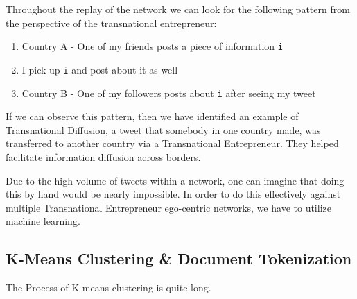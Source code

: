 \par

Throughout the replay of the network we can look for the following pattern from the perspective of the transnational entrepreneur:

\begin{enumerate}
\item Country A - One of my friends posts a piece of information \verb|i| 
\item I pick up \verb|i| and post about it as well
\item Country B - One of my followers posts about \verb|i| after seeing my tweet
\end{enumerate}

If we can observe this pattern, then we have identified an example of Transnational Diffusion, a tweet that somebody in one country made, was transferred to another country via a Transnational Entrepreneur. They helped facilitate information diffusion across borders.
\par
Due to the high volume of tweets within a network, one can imagine that doing this by hand would be nearly impossible. In order to do this effectively against multiple Transnational Entrepreneur ego-centric networks, we have to utilize machine learning.

\subsection{K-Means Clustering \& Document Tokenization}
The Process of K means clustering is quite long.
